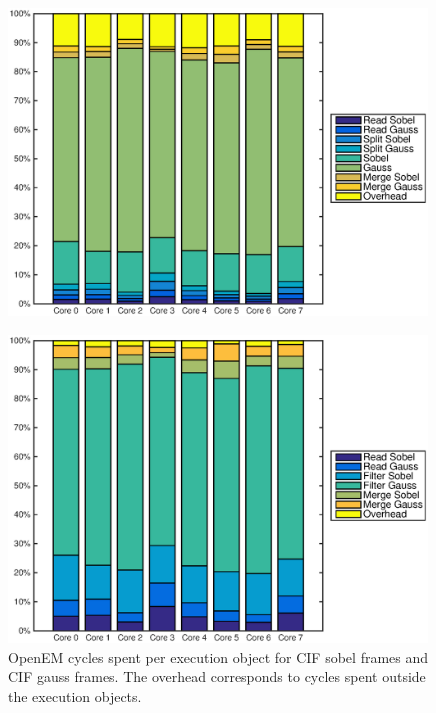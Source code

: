 \begin{figure}
    \begin{center}
        \includegraphics[width=0.99\textwidth]{images/openem_cifcif_8cores_func.eps}
        \label{fig:oem8corefunc}
    \end{center}
\end{figure}

\begin{figure}[h!]
    \begin{center}
        \includegraphics[width=0.99\textwidth]{images/openem_cifcif_8cores_eo.eps}
        \caption{OpenEM cycles spent per execution object for CIF sobel frames
        and CIF gauss frames. The overhead corresponds to cycles spent outside
        the execution objects.}
        \label{fig:oem8coreeo}
    \end{center}
\end{figure}

